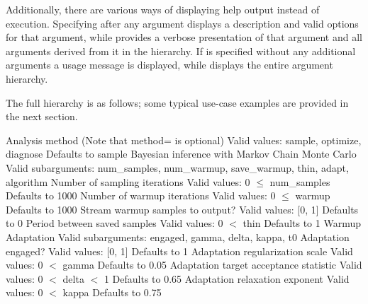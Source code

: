 Additionally, there are various ways of displaying help output instead
of execution.  Specifying  after any argument displays a 
description and valid options for that argument, while 
provides a verbose presentation of that argument and all arguments
derived from it in the hierarchy.  If  is specified without any
additional arguments a usage message is displayed, while 
displays the entire argument hierarchy.

The full hierarchy is as follows; some typical use-case examples 
are provided in the next section.

\pagebreak

\begin{description}
  {Analysis method (Note that method= is optional)}
  {Valid values: sample, optimize, diagnose}
  {Defaults to sample}
%
    {Bayesian inference with Markov Chain Monte Carlo}
    {Valid subarguments: num\_samples, num\_warmup, save\_warmup, thin, adapt, algorithm}
%
      {Number of sampling iterations}
      {Valid values: 0 $\le$ num\_samples}
      {Defaults to 1000}
%
      {Number of warmup iterations}
      {Valid values: 0 $\le$ warmup}
      {Defaults to 1000}
%
      {Stream warmup samples to output?}
      {Valid values: [0, 1]}
      {Defaults to 0}
%
      {Period between saved samples}
      {Valid values: 0 $<$ thin}
      {Defaults to 1}
%
      {Warmup Adaptation}
      {Valid subarguments: engaged, gamma, delta, kappa, t0}
%
        {Adaptation engaged?}
        {Valid values: [0, 1]}
        {Defaults to 1}
%
        {Adaptation regularization scale}
        {Valid values: 0 $<$ gamma}
        {Defaults to 0.05}
%
        {Adaptation target acceptance statistic}
        {Valid values: 0 $<$ delta $<$ 1}
        {Defaults to 0.65}
%
        {Adaptation relaxation exponent}
        {Valid values: 0 $<$ kappa}
        {Defaults to 0.75}

\end{description}
